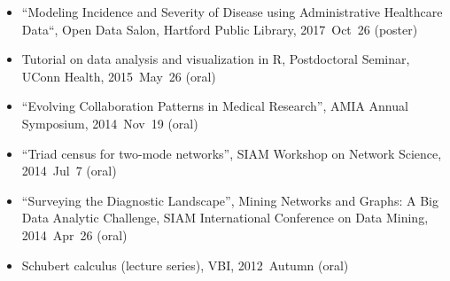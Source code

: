 \documentclass[10pt,a4paper]{article}
\begin{document}
\begin{itemize}[label=$\circ$,nolistsep]
\item
``Modeling Incidence and Severity of Disease using Administrative Healthcare Data``, Open Data Salon, Hartford Public Library, 2017~Oct~26 (poster)
\item
Tutorial on data analysis and visualization in R, Postdoctoral Seminar, UConn Health, 2015~May~26 (oral)
\item
``Evolving Collaboration Patterns in Medical Research'', AMIA Annual Symposium, 2014~Nov~19 (oral)
\item
``Triad census for two-mode networks'', SIAM Workshop on Network Science, 2014~Jul~7 (oral)
\item
``Surveying the Diagnostic Landscape'', Mining Networks and Graphs: A Big Data Analytic Challenge, SIAM International Conference on Data Mining, 2014~Apr~26 (oral)
\item
Schubert calculus (lecture series), VBI, 2012~Autumn (oral)

\end{itemize}
\end{document}
